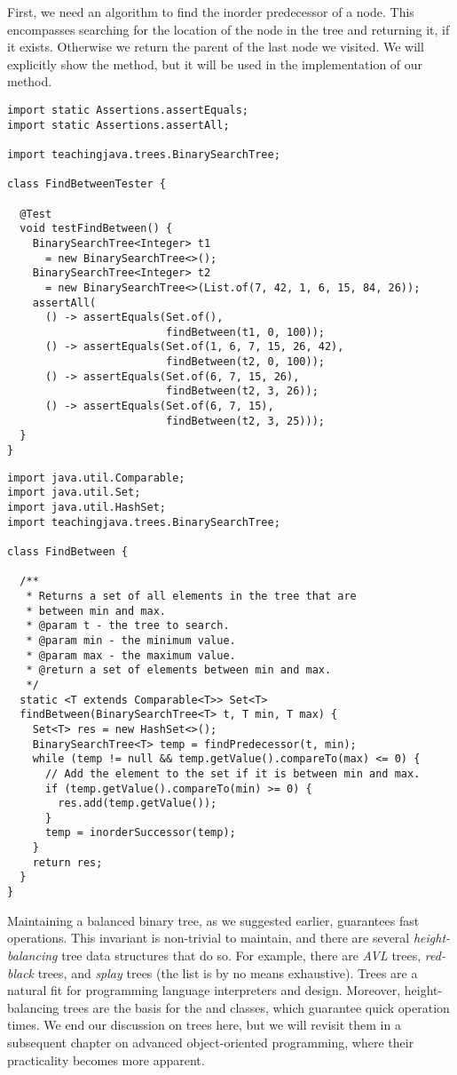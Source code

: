First, we need an algorithm to find the inorder predecessor of a node. 
This encompasses searching for the location of the node in the tree and returning it, if it exists. Otherwise we return the parent of the last node we visited. We will explicitly show the  method, but it will be used in the implementation of our  method.

\enlargethispage{2\baselineskip}
\begin{lstlisting}[language=MyJava]
import static Assertions.assertEquals;
import static Assertions.assertAll;

import teachingjava.trees.BinarySearchTree;

class FindBetweenTester {

  @Test
  void testFindBetween() {
    BinarySearchTree<Integer> t1 
      = new BinarySearchTree<>();
    BinarySearchTree<Integer> t2 
      = new BinarySearchTree<>(List.of(7, 42, 1, 6, 15, 84, 26));
    assertAll(
      () -> assertEquals(Set.of(), 
                         findBetween(t1, 0, 100));
      () -> assertEquals(Set.of(1, 6, 7, 15, 26, 42), 
                         findBetween(t2, 0, 100));
      () -> assertEquals(Set.of(6, 7, 15, 26), 
                         findBetween(t2, 3, 26));
      () -> assertEquals(Set.of(6, 7, 15), 
                         findBetween(t2, 3, 25)));
  }
}
\end{lstlisting}

\begin{lstlisting}[language=MyJava]
import java.util.Comparable;
import java.util.Set;
import java.util.HashSet;
import teachingjava.trees.BinarySearchTree;

class FindBetween {

  /**
   * Returns a set of all elements in the tree that are 
   * between min and max.
   * @param t - the tree to search.
   * @param min - the minimum value.
   * @param max - the maximum value.
   * @return a set of elements between min and max.
   */
  static <T extends Comparable<T>> Set<T> 
  findBetween(BinarySearchTree<T> t, T min, T max) {
    Set<T> res = new HashSet<>();
    BinarySearchTree<T> temp = findPredecessor(t, min);
    while (temp != null && temp.getValue().compareTo(max) <= 0) {
      // Add the element to the set if it is between min and max.
      if (temp.getValue().compareTo(min) >= 0) {
        res.add(temp.getValue());
      }
      temp = inorderSuccessor(temp);
    }
    return res;
  }
}
\end{lstlisting}

Maintaining a balanced binary tree, as we suggested earlier, guarantees fast operations. 
This invariant is non-trivial to maintain, and there are several \emph{height-balancing} tree data structures that do so. 
For example, there are \emph{AVL} trees, \emph{red-black} trees, and \emph{splay} trees (the list is by no means exhaustive). 
Trees are a natural fit for programming language interpreters and design. Moreover, height-balancing trees are the basis for the  and  classes, which guarantee quick operation times.
We end our discussion on trees here, but we will revisit them in a subsequent chapter on advanced object-oriented programming, where their practicality becomes more apparent.